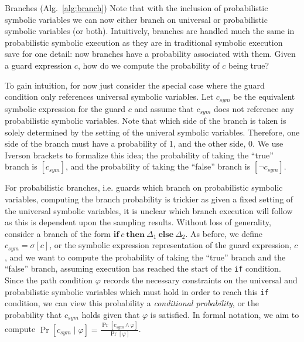 \begin{paragraph}{Branches (Alg.~\ref{alg:branch})}
	Note that with the inclusion of probabilistic symbolic variables we can now either branch on universal or probabilistic symbolic variables (or both).
	Intuitively, branches are handled much the same in probabilistic symbolic execution as they are in traditional symbolic execution save for one detail: now branches have a probability associated with them.
	Given a guard expression $c$, how do we compute the probability of $c$ being true?
	
	
	To gain intuition, for now just consider the special case where the guard condition only references universal symbolic variables.
	Let $c_{sym}$ be the equivalent symbolic expression for the guard $c$ and assume that $c_{sym}$ does not reference any probabilistic symbolic variables.
	Note that which side of the branch is taken is solely determined by the setting of the univeral symbolic variables.
	Therefore, one side of the branch must have a probability of 1, and the other side, 0.
	We use Iverson brackets to formalize this idea; the probability of taking the ``true'' branch is $[c_{sym}]$, and the probability of taking the ``false'' branch is $[\neg c_{sym}]$.
	
	
	For probabilistic branches, i.e. guards which branch on probabilistic symbolic variables, computing the branch probability is trickier as given a fixed setting of the universal symbolic variables, it is unclear which branch execution will follow as this is dependent upon the sampling results.
	Without loss of generality, consider a branch of the form $\mathbf{if}~c~\mathbf{then}~\Delta_1~\mathbf{else}~\Delta_2$.
	As before, we define $c_{sym} = \sigma[c]$, or the symbolic expression representation of the guard expression, $c$, and we want to compute the probability of taking the ``true'' branch and the ``false'' branch, assuming execution has reached the start of the \texttt{if} condition.
	Since the path condition $\varphi$ records the necessary constraints on the universal and probabilistic symbolic variables which must hold in order to reach this \texttt{if} condition, we can view this probability a \textit{conditional probability}, or the probability that $c_{sym}$ holds given that $\varphi$ is satisfied.
	In formal notation, we aim to compute $\Pr[c_{sym} \mid \varphi] = \frac{\Pr[c_{sym}\wedge \varphi]}{\Pr[\varphi]}$.
	

\end{paragraph}
